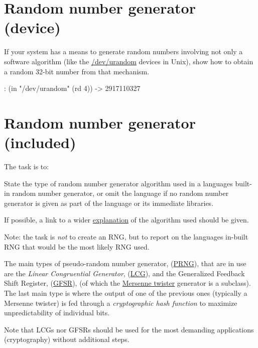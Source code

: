 \pagebreak{}
\section*{Random number generator (device)}

If your system has a means to generate random numbers involving not only
a software algorithm (like the \href{http://en.wikipedia.org/wiki//dev/random}{/dev/urandom} devices in
Unix), show how to obtain a random 32-bit number from that mechanism.

\begin{wideverbatim}

: (in "/dev/urandom" (rd 4))
-> 2917110327

\end{wideverbatim}

\pagebreak{}
\section*{Random number generator (included)}

The task is to:

State the type of random number generator algorithm used in a languages
built-in random number generator, or omit the language if no random
number generator is given as part of the language or its immediate
libraries.

If possible, a link to a wider
\href{http://en.wikipedia.org/wiki/List\_of\_random\_number\_generators}{explanation}
of the algorithm used should be given.

Note: the task is \emph{not} to create an RNG, but to report on the
languages in-built RNG that would be the most likely RNG used.

The main types of pseudo-random number generator,
(\href{http://en.wikipedia.org/wiki/PRNG}{PRNG}), that are in use are
the \emph{Linear Congruential Generator},
(\href{http://en.wikipedia.org/wiki/Linear\_congruential\_generator}{LCG}),
and the Generalized Feedback Shift Register,
(\href{http://en.wikipedia.org/wiki/Generalised\_feedback\_shift\_register\#Non-binary\_Galois\_LFSR}{GFSR}),
(of which the
\href{http://en.wikipedia.org/wiki/Mersenne\_twister}{Mersenne
  twister} generator is a subclass). The last main type is where the
output of one of the previous ones (typically a Mersenne twister) is
fed through a \emph{cryptographic hash function} to maximize
unpredictability of individual bits.

Note that LCGs nor GFSRs should be used for the most demanding
applications (cryptography) without additional steps.

